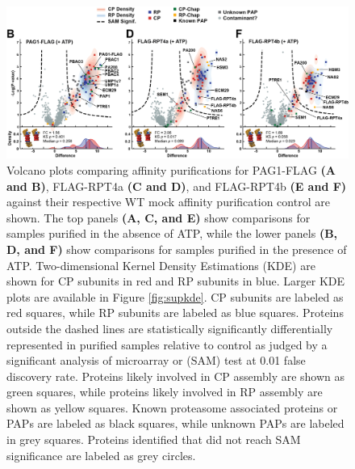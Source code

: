 \begin{figure}
	\ContinuedFloat
	\centering
	\includegraphics[width=\columnwidth]{Proteasome/Volcanosplit2.png}
	{Volcano plots comparing affinity purifications for PAG1-FLAG \textbf{(A and B)}, FLAG-RPT4a \textbf{(C and D)}, and FLAG-RPT4b \textbf{(E and F)} against their respective WT mock affinity purification control are shown. The top panels \textbf{(A, C, and E)} show comparisons for samples purified in the absence of ATP, while the lower panels \textbf{(B, D, and F)} show comparisons for samples purified in the presence of ATP. Two-dimensional Kernel Density Estimations (KDE) are shown for CP subunits in red and RP subunits in blue. Larger KDE plots are available in Figure \ref{fig:supkde}. CP subunits are labeled as red squares, while RP subunits are labeled as blue squares. Proteins outside the dashed lines are statistically significantly differentially represented in purified samples relative to control as judged by a significant analysis of microarray or (SAM) test at 0.01 false discovery rate. Proteins likely involved in CP assembly are shown as green squares, while proteins likely involved in RP assembly are shown as yellow squares. Known proteasome associated proteins or PAPs are labeled as black squares, while unknown PAPs are labeled in grey squares. Proteins identified that did not reach SAM significance are labeled as grey circles.}
	\label{fig:volcanos2}
\end{figure}

